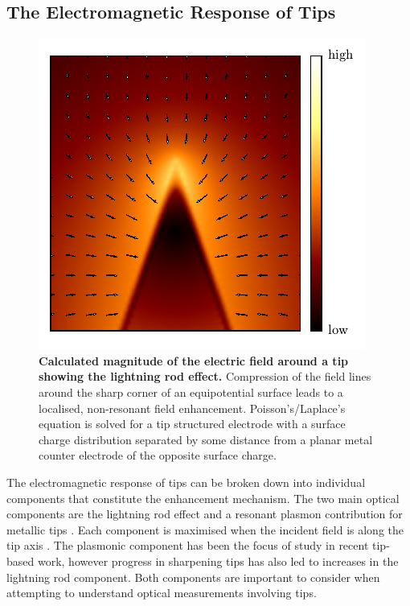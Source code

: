 \documentclass{article}
\begin{document}
\subsection{The Electromagnetic Response of Tips}

\begin{figure}
\centering
\vspace{-15pt}
\includegraphics[width=\textwidth]{figures/lightning_rod_effect}
\vspace{-25pt}
\caption[Calculated magnitude of the electric field around a tip showing the lightning rod effect]{\textbf{Calculated magnitude of the electric field around a tip showing the lightning rod effect.} Compression of the field lines around the sharp corner of an equipotential surface leads to a localised, non-resonant field enhancement. Poisson's/Laplace's equation is solved for a tip structured electrode with a surface charge distribution separated by some distance from a planar metal counter electrode of the opposite surface charge.}
\label{fig:lightning_rod_effect}
\end{figure}

The electromagnetic response of tips can be broken down into individual components that constitute the enhancement mechanism. The two main optical components are the lightning rod effect and a resonant plasmon contribution for metallic tips \cite{esteban2006, zhang2009, schmid2013}. Each component is maximised when the incident field is along the tip axis \cite{zhang2014}. The plasmonic component has been the focus of study in recent tip-based work, however progress in sharpening tips has also led to increases in the lightning rod component. Both components are important to consider when attempting to understand optical measurements involving tips.
\end{document}
